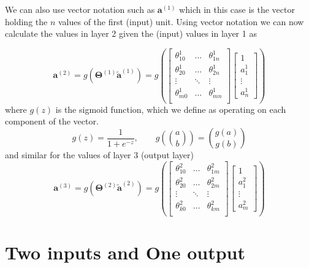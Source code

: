 \documentclass{report}
\begin{document}
We can also use vector notation such as $\mathbf{a}^{(1)}$ which in this case is the vector holding the $n$ values of the first (input) unit. Using vector notation we can now calculate the values in layer 2 given the (input) values in layer 1 as

\begin{equation*}
  \mathbf{a}^{(2)} = g(\mathbf{\Theta}^{(1)}\mathbf{\tilde{a}}^{(1)}) = 
  g(
  \begin{bmatrix}
    \theta^1_{10} & \hdots & \theta^1_{1n}\\ 
    \theta^1_{20} & \hdots & \theta^1_{2n}\\ 
    \vdots & \ddots & \vdots\\ 
    \theta^1_{m0} & \hdots & \theta^1_{mn}\\ 
  \end{bmatrix}
  \begin{bmatrix}
     1 \\
     a^1_1 \\
     \vdots  \\
     a^1_n 
  \end{bmatrix}
  )
\end{equation*}
where $g(z)$ is the sigmoid function, which we define as operating on each component of the vector.
$$
    g(z) = \frac{1}{1+e^{-z}},  \qquad g(\binom{a}{b}) = \binom{g(a)}{g(b)}
$$
and similar for the values of layer 3 (output layer)
\begin{equation*}
  \mathbf{a}^{(3)} = g(\mathbf{\Theta}^{(2)}\mathbf{\tilde{a}}^{(2)}) =  
   g(
  \begin{bmatrix}
    \theta^2_{10} & \hdots & \theta^2_{1m}\\ 
    \theta^2_{20} & \hdots & \theta^2_{2m}\\ 
    \vdots & \ddots & \vdots\\ 
    \theta^2_{k0} & \hdots & \theta^2_{km}\\ 
  \end{bmatrix}
  \begin{bmatrix}
     1 \\
     a^2_1 \\
     \vdots  \\
     a^2_m 
  \end{bmatrix}
 )
\end{equation*}

\section{Two inputs and One output}
\end{document}
